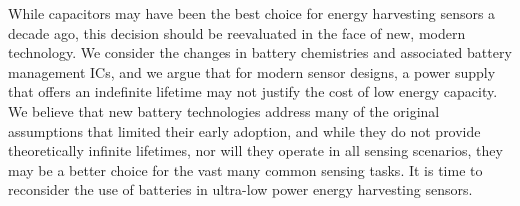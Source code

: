 




While capacitors may have been the best choice for energy harvesting sensors a decade
ago, this decision should be reevaluated in the face of new, modern technology.
We consider the changes in battery chemistries and associated
battery management ICs, and we argue that for modern sensor designs, a power
supply that offers an indefinite lifetime may not justify the cost of low energy
capacity. We believe that new battery technologies address many of the original
assumptions that limited their early adoption, and while they do not provide theoretically
infinite lifetimes, nor will they operate in all sensing scenarios, they may be
a better choice for the vast many common sensing tasks. It is time to reconsider the
use of batteries in ultra-low power energy harvesting sensors.

